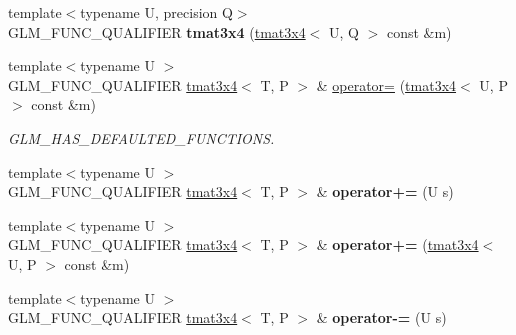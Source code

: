 \begin{DoxyCompactItemize}
\item 
\mbox{\label{structglm_1_1tmat3x4_a1117842438c01204536f3829257eaa12}} 
{\footnotesize template$<$typename U, precision Q$>$ }\\G\+L\+M\+\_\+\+F\+U\+N\+C\+\_\+\+Q\+U\+A\+L\+I\+F\+I\+ER {\bfseries tmat3x4} (\hyperlink{structglm_1_1tmat3x4}{tmat3x4}$<$ U, Q $>$ const \&m)
\item 
\mbox{\label{structglm_1_1tmat3x4_a819a25fbfbbf505d7304adec59824063}} 
{\footnotesize template$<$typename U $>$ }\\G\+L\+M\+\_\+\+F\+U\+N\+C\+\_\+\+Q\+U\+A\+L\+I\+F\+I\+ER \hyperlink{structglm_1_1tmat3x4}{tmat3x4}$<$ T, P $>$ \& \hyperlink{structglm_1_1tmat3x4_a819a25fbfbbf505d7304adec59824063}{operator=} (\hyperlink{structglm_1_1tmat3x4}{tmat3x4}$<$ U, P $>$ const \&m)
\begin{DoxyCompactList}\small\item\em G\+L\+M\+\_\+\+H\+A\+S\+\_\+\+D\+E\+F\+A\+U\+L\+T\+E\+D\+\_\+\+F\+U\+N\+C\+T\+I\+O\+NS. \end{DoxyCompactList}\item 
\mbox{\label{structglm_1_1tmat3x4_a1a06efd807d1d694d6c3d6c25227f6f5}} 
{\footnotesize template$<$typename U $>$ }\\G\+L\+M\+\_\+\+F\+U\+N\+C\+\_\+\+Q\+U\+A\+L\+I\+F\+I\+ER \hyperlink{structglm_1_1tmat3x4}{tmat3x4}$<$ T, P $>$ \& {\bfseries operator+=} (U s)
\item 
\mbox{\label{structglm_1_1tmat3x4_a67a241cb6158b5d52e8530ed74ed99cd}} 
{\footnotesize template$<$typename U $>$ }\\G\+L\+M\+\_\+\+F\+U\+N\+C\+\_\+\+Q\+U\+A\+L\+I\+F\+I\+ER \hyperlink{structglm_1_1tmat3x4}{tmat3x4}$<$ T, P $>$ \& {\bfseries operator+=} (\hyperlink{structglm_1_1tmat3x4}{tmat3x4}$<$ U, P $>$ const \&m)
\item 
\mbox{\label{structglm_1_1tmat3x4_a15e2144679bbd267e558953161329d8e}} 
{\footnotesize template$<$typename U $>$ }\\G\+L\+M\+\_\+\+F\+U\+N\+C\+\_\+\+Q\+U\+A\+L\+I\+F\+I\+ER \hyperlink{structglm_1_1tmat3x4}{tmat3x4}$<$ T, P $>$ \& {\bfseries operator-\/=} (U s)
\item 
\mbox{\label{structglm_1_1tmat3x4_ad0445e23bd233b7c793c91519cf1c817}} 

\end{DoxyCompactItemize}
